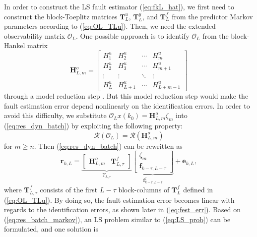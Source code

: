 \documentclass[twocolumn]{autart}
\begin{document}
In order to construct the LS fault estimator (\ref{eq:fkL_hat}), we first need to construct the block-Toeplitz matrices $\mathbf{T}_L^u$, $\mathbf{T}_L^y$, and $\mathbf{T}_L^f$ from the predictor Markov parameters according to (\ref{eq:OL_TLu}).
Then, we need the extended observability matrix $\mathcal{O}_L$. One possible approach is to identify $\mathcal{O}_L$ from the block-Hankel matrix
\begin{equation}\label{eq:HLm}
\mathbf{H}_{L,m}^o = \left[
\begin{matrix}
  H_1^u & H_2^u & \cdots & H_m^u \\
  H_2^u & H_3^u & \cdots & H_{m+1}^u \\
  \vdots & \vdots & \ddots & \vdots \\
  H_L^u & H_{L+1}^u & \cdots & H_{L+m-1}^u
\end{matrix}
 \right]
\end{equation}
through a model reduction step \cite{Veen2012}. But this model reduction step would make the fault estimation error depend nonlinearly on 
the identification errors. In order to avoid this difficulty, we substitute 
$\mathcal{O}_L x(k_0) = \mathbf{H}_{L,m}^o \zeta_{m}$ into (\ref{eq:res_dyn_batch}) by exploiting the following property:
\begin{equation}\label{eq:range_HLm}
\mathcal{R} \left( \mathcal{O}_L \right) = \mathcal{R} \left( \mathbf{H}_{L,m}^o \right)
\end{equation} for $m \geq n$.
Then (\ref{eq:res_dyn_batch}) can be rewritten as
\begin{equation}\label{eq:res_batch_markov}
\mathbf{r}_{k,L} = \underbrace{\left[ \begin{array}{cc}
                        \mathbf{H}_{L,m}^o & \mathbf{T}_{L,\tau}^{f}
                      \end{array} \right]}_{\Upsilon_{L,\tau}} 
   \underbrace{\left[ \begin{array}{c}
                        \zeta_m \\
                        \mathbf{f}_{k-\tau,L-\tau}
                      \end{array} \right]}_{\mathbf{f}_{k-\tau,L-\tau}^\zeta} + {\mathbf{e}_{k,L}},
\end{equation}
where $\mathbf{T}_{L,\tau}^{f}$ consists of the first $L-\tau$ block-columns of $\mathbf{T}_{L}^{f}$ defined in (\ref{eq:OL_TLu}).
By doing so, the fault estimation error becomes linear with regards to the identification errors, as shown later in (\ref{eq:fest_err}).
Based on (\ref{eq:res_batch_markov}), an LS problem similar to (\ref{eq:LS_prob}) can be formulated, and one solution is
\end{document}
